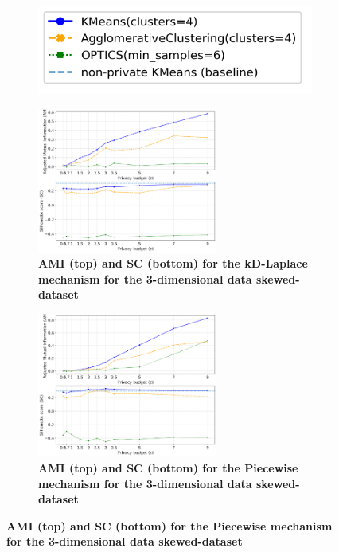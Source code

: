 \newpage
\begin{figure}[H]
    \centering
    \begin{subfigure}{0.3\textwidth}
        \includegraphics[width=\textwidth]{Results/kd-laplace/kd-Laplace/skewed-dataset/legend_3.png}
    \end{subfigure}
    \begin{subfigure}{1\textwidth}
        \caption{\textbf{AMI (top) and SC (bottom) for the kD-Laplace mechanism for the 3-dimensional data skewed-dataset}}
        \centering
        \includegraphics[width=0.65\textwidth]{Results/kd-laplace/kd-Laplace/skewed-dataset/ami-and-sc_3_dimensions.png}
        \centering
    \end{subfigure}
    \begin{subfigure}{1\textwidth}
        \caption{\textbf{AMI (top) and SC (bottom) for the Piecewise mechanism for the 3-dimensional data skewed-dataset}}
        \centering
        \includegraphics[width=0.65\textwidth]{Results/kd-laplace/piecewise/skewed-dataset/ami-and-sc_3_dimensions.png}
    \end{subfigure}
    \label{fig:validation-skewed-dataset_comparison_3d-laplace}
\end{figure}
\newpage
